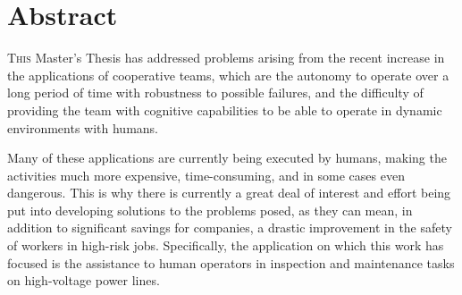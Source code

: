 \chapter*{Abstract}
\pagestyle{especial}
{}

\lettrine[lraise=-0.1, lines=2, loversize=0.2]{T}{his} Master's Thesis has addressed problems arising from the recent increase in the applications of cooperative  teams, which are the autonomy to operate over a long period of time with robustness to possible failures, and the difficulty of providing the team with cognitive capabilities to be able to operate in dynamic environments with humans.

Many of these applications are currently being executed by humans, making the activities much more expensive, time-consuming, and in some cases even dangerous. This is why there is currently a great deal of interest and effort being put into developing solutions to the problems posed, as they can mean, in addition to significant savings for companies, a drastic improvement in the safety of workers in high-risk jobs. Specifically, the application on which this work has focused is the assistance to human operators in inspection and maintenance tasks on high-voltage power lines.

